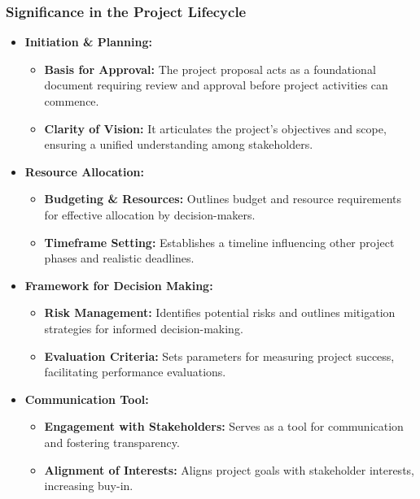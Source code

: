 \documentclass[aspectratio=169]{beamer}
\begin{document}
\begin{frame}[fragile]
    \frametitle{Significance in the Project Lifecycle}
    \begin{itemize}
        \item \textbf{Initiation \& Planning:}
        \begin{itemize}
            \item \textbf{Basis for Approval:} The project proposal acts as a foundational document requiring review and approval before project activities can commence.
            \item \textbf{Clarity of Vision:} It articulates the project’s objectives and scope, ensuring a unified understanding among stakeholders.
        \end{itemize}
        
        \item \textbf{Resource Allocation:}
        \begin{itemize}
            \item \textbf{Budgeting \& Resources:} Outlines budget and resource requirements for effective allocation by decision-makers.
            \item \textbf{Timeframe Setting:} Establishes a timeline influencing other project phases and realistic deadlines.
        \end{itemize}

        \item \textbf{Framework for Decision Making:}
        \begin{itemize}
            \item \textbf{Risk Management:} Identifies potential risks and outlines mitigation strategies for informed decision-making.
            \item \textbf{Evaluation Criteria:} Sets parameters for measuring project success, facilitating performance evaluations.
        \end{itemize}

        \item \textbf{Communication Tool:}
        \begin{itemize}
            \item \textbf{Engagement with Stakeholders:} Serves as a tool for communication and fostering transparency.
            \item \textbf{Alignment of Interests:} Aligns project goals with stakeholder interests, increasing buy-in.
        \end{itemize}
    \end{itemize}
\end{frame}
\end{document}
